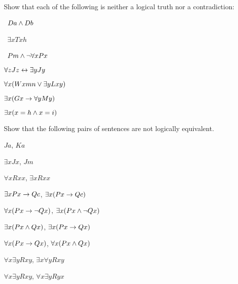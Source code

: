 \solutions
\problempart
\label{pr.Contingent}
Show that each of the following is neither a logical truth nor a contradiction:
\begin{earg}
\item \leftsolutions\ $Da \wedge Db$
\item \leftsolutions\ $\exists x Txh$
\item \leftsolutions\ $Pm \wedge \neg\forall x Px$
\item $\forall z Jz \leftrightarrow \exists y Jy$
\item $\forall x (Wxmn \vee \exists yLxy)$
\item $\exists x (Gx \rightarrow \forall y My)$
\item $\exists x (x = h \wedge x = i)$
\end{earg}

\solutions
\problempart
\label{pr.NotEquiv}
Show that the following pairs of sentences are not logically equivalent.
\begin{earg}
\item $Ja$, $Ka$
\item $\exists x Jx$, $Jm$
\item $\forall x Rxx$, $\exists x Rxx$
\item $\exists x Px \rightarrow Qc$, $\exists x (Px \rightarrow Qc)$
\item $\forall x(Px \rightarrow \neg Qx)$, $\exists x(Px \wedge \neg Qx)$
\item $\exists x(Px \wedge Qx)$, $\exists x(Px \rightarrow Qx)$
\item $\forall x(Px\rightarrow Qx)$, $\forall x(Px \wedge Qx)$
\item $\forall x\exists y Rxy$, $\exists x\forall y Rxy$
\item $\forall x\exists y Rxy$, $\forall x\exists y Ryx$
\end{earg}


